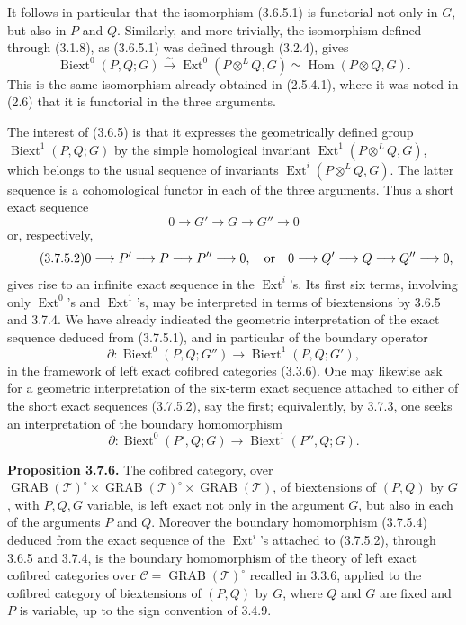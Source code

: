 \documentclass[11pt]{article}
\providecommand{\Hom}{\operatorname{Hom}}
\providecommand{\Ext}{\operatorname{Ext}}
\providecommand{\Biext}{\operatorname{Biext}}
\providecommand{\Ext}{\operatorname{Ext}}
\providecommand{\GRAB}{\operatorname{GRAB}}
\providecommand{\cT}{\mathcal T}
\begin{document}
It follows in particular that the isomorphism (3.6.5.1) is functorial not only in \(G\), but also in \(P\) and \(Q\).  Similarly, and more trivially, the isomorphism defined through (3.1.8), as (3.6.5.1) was defined through (3.2.4), gives
\begin{equation}\tag{3.7.4}
 \Biext^0(P,Q;G)\xrightarrow{\sim}
 \Ext^0(P\otimes^L Q,G)\simeq \Hom(P\otimes Q,G).
\end{equation}
This is the same isomorphism already obtained in (2.5.4.1), where it was noted in (2.6) that it is functorial in the three arguments.

The interest of (3.6.5) is that it expresses the geometrically defined group \(\Biext^1(P,Q;G)\) by the simple homological invariant \(\Ext^1(P\otimes^L Q,G)\), which belongs to the usual sequence of invariants \(\Ext^i(P\otimes^L Q,G)\).  The latter sequence is a cohomological functor in each of the three arguments.  Thus a short exact sequence
\begin{equation}\tag{3.7.5.1}
        0\longrightarrow G'\longrightarrow G\longrightarrow G''\longrightarrow 0
\end{equation}
or, respectively,
\begin{equation}\tag{3.7.5.2}
        0\longrightarrow P'\longrightarrow P\longrightarrow P''\longrightarrow 0,
        \quad\hbox{or}\quad
        0\longrightarrow Q'\longrightarrow Q\longrightarrow Q''\longrightarrow 0,
\end{equation}
gives rise to an infinite exact sequence in the \(\Ext^i\)'s.  Its first six terms, involving only \(\Ext^0\)'s and \(\Ext^1\)'s, may be interpreted in terms of biextensions by 3.6.5 and 3.7.4.  We have already indicated the geometric interpretation of the exact sequence deduced from (3.7.5.1), and in particular of the boundary operator
\begin{equation}\tag{3.7.5.3}
 \partial:\Biext^0(P,Q;G'')\longrightarrow \Biext^1(P,Q;G'),
\end{equation}
in the framework of left exact cofibred categories (3.3.6).  One may likewise ask for a geometric interpretation of the six-term exact sequence attached to either of the short exact sequences (3.7.5.2), say the first; equivalently, by 3.7.3, one seeks an interpretation of the boundary homomorphism
\begin{equation}\tag{3.7.5.4}
 \partial:\Biext^0(P',Q;G)\longrightarrow \Biext^1(P'',Q;G).
\end{equation}

\textbf{Proposition 3.7.6.}  The cofibred category, over
\(\GRAB(\cT)^{\circ}\times\GRAB(\cT)^{\circ}\times\GRAB(\cT)\), of biextensions of \((P,Q)\) by \(G\), with \(P,Q,G\) variable, is left exact not only in the argument \(G\), but also in each of the arguments \(P\) and \(Q\).  Moreover the boundary homomorphism (3.7.5.4) deduced from the exact sequence of the \(\Ext^i\)'s attached to (3.7.5.2), through 3.6.5 and 3.7.4, is the boundary homomorphism of the theory of left exact cofibred categories over
\(\mathcal C=\GRAB(\cT)^{\circ}\) recalled in 3.3.6, applied to the cofibred category of biextensions of \((P,Q)\) by \(G\), where \(Q\) and \(G\) are fixed and \(P\) is variable, up to the sign convention of 3.4.9.
\end{document}
